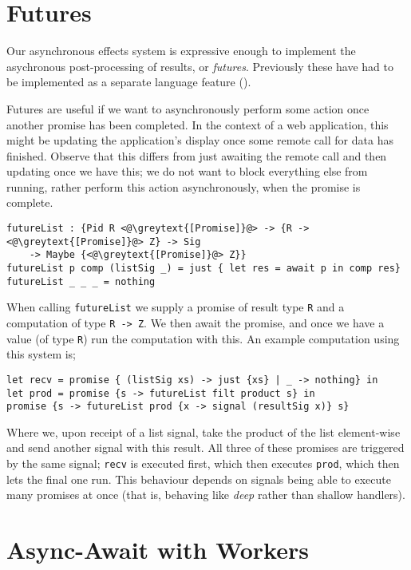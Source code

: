\documentclass[msc,deptreport,cs]{infthesis} %
\newcommand{\code}[1]{\lstinline{#1}}
\newcommand{\greytext}[1]{\textcolor{black!40}{#1}}
\begin{document}
\section{Futures}
\label{sec:futures}

Our asynchronous effects system is expressive enough to implement the
asychronous post-processing of results, or \emph{futures}. Previously these have
had to be implemented as a separate language feature
(\cite{schwinghammer2002concurrent}).

Futures are useful if we want to asynchronously perform some action once another
promise has been completed. In the context of a web application, this might be
updating the application's display once some remote call for data has finished.
Observe that this differs from just awaiting the remote call and then updating
once we have this; we do not want to block everything else from running, rather
perform this action asynchronously, when the promise is complete.

\begin{lstlisting}
futureList : {Pid R <@\greytext{[Promise]}@> -> {R -> <@\greytext{[Promise]}@> Z} -> Sig
    -> Maybe {<@\greytext{[Promise]}@> Z}}
futureList p comp (listSig _) = just { let res = await p in comp res}
futureList _ _ _ = nothing
\end{lstlisting}

\noindent When calling \code{futureList} we supply a promise of result type
\code{R} and a computation of type \code{R -> Z}. We then await the promise, and
once we have a value (of type \code{R}) run the computation with this. An
example computation using this system is;

\begin{lstlisting}
let recv = promise { (listSig xs) -> just {xs} | _ -> nothing} in
let prod = promise {s -> futureList filt product s} in
promise {s -> futureList prod {x -> signal (resultSig x)} s}
\end{lstlisting}

\noindent Where we, upon receipt of a list signal, take the product of the list
element-wise and send another signal with this result. All three of these
promises are triggered by the same signal; \code{recv} is executed first, which
then executes \code{prod}, which then lets the final one run. This behaviour
depends on signals being able to execute many promises at once (that is,
behaving like \emph{deep} rather than shallow handlers).

\section{Async-Await with Workers}
\label{sec:async-await}
\end{document}
